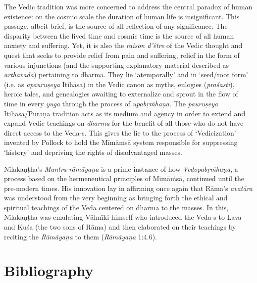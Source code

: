 The Vedic tradition was more concerned to address the central paradox of human existence: on the cosmic scale the duration of human life is insignificant. This passage, albeit brief, is the source of all reflection of any significance. The disparity between the lived time and cosmic time is the source of all human anxiety and suffering. Yet, it is also the \textit{raison d'être} of the Vedic thought and quest that seeks to provide relief from pain and suffering, relief in the form of various injunctions (and the supporting explanatory material described as \textit{arthavāda}) pertaining to dharma. They lie ‘atemporally’ and in ‘seed/root form’ (i.e. as \textit{apauruṣeya}  Itihāsa) in the Vedic canon as myths, eulogies (\textit{praśasti}), heroic tales, and genealogies awaiting to externalize and sprout in the flow of time in every \textit{yuga} through the process of \textit{upabṛṁhaṇa.} The \textit{pauruṣeya} Itihāsa/Purāṇa tradition acts as its medium and agency in order to extend and expand Vedic teachings on \textit{dharma} for the benefit of all those who do not have direct access to the Veda-s. This gives the lie to the process of ‘Vedicization’ invented by Pollock to hold the Mīmāṁsā system responsible for suppressing ‘history’ and depriving the rights of disadvantaged masses.

Nīlakaṇṭha's \textit{Mantra-rāmāyaṇa} is a prime instance of how \textit{Vedopabṛṁ\-haṇa}, a process based on the hermeneutical principles of Mīmāṁsā, continued until the pre-modern times. His innovation lay in affirming once again that Rāma's \textit{avatāra} was understood from the very beginning as bringing forth the ethical and spiritual teachings of the Veda centered on dharma to the masses. In this, Nīlakaṇṭha was emulating Vālmīki himself who introduced the Veda-s to Lava and Kuśa (the two sons of Rāma) and then elaborated on their teachings by reciting the \textit{Rāmāyaṇa} to them (\textit{Rāmāyaṇa} 1:4.6).


\section*{Bibliography}

